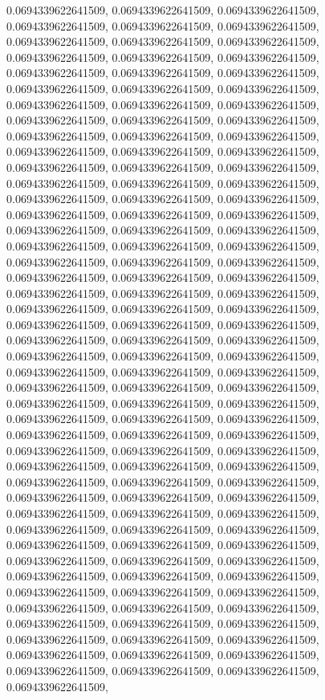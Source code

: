 \documentclass[
  ,man]{apa6}
\begin{document}
0.0694339622641509, 0.0694339622641509, 0.0694339622641509, 0.0694339622641509, 0.0694339622641509, 0.0694339622641509, 0.0694339622641509, 0.0694339622641509, 0.0694339622641509, 0.0694339622641509, 0.0694339622641509, 0.0694339622641509, 0.0694339622641509, 0.0694339622641509, 0.0694339622641509, 0.0694339622641509, 0.0694339622641509, 0.0694339622641509, 0.0694339622641509, 0.0694339622641509, 0.0694339622641509, 0.0694339622641509, 0.0694339622641509, 0.0694339622641509, 0.0694339622641509, 0.0694339622641509,
0.0694339622641509, 0.0694339622641509, 0.0694339622641509, 0.0694339622641509, 0.0694339622641509, 0.0694339622641509, 0.0694339622641509, 0.0694339622641509, 0.0694339622641509, 0.0694339622641509, 0.0694339622641509, 0.0694339622641509, 0.0694339622641509, 0.0694339622641509, 0.0694339622641509, 0.0694339622641509, 0.0694339622641509, 0.0694339622641509, 0.0694339622641509, 0.0694339622641509, 0.0694339622641509, 0.0694339622641509, 0.0694339622641509, 0.0694339622641509, 0.0694339622641509, 0.0694339622641509,
0.0694339622641509, 0.0694339622641509, 0.0694339622641509, 0.0694339622641509, 0.0694339622641509, 0.0694339622641509, 0.0694339622641509, 0.0694339622641509, 0.0694339622641509, 0.0694339622641509, 0.0694339622641509, 0.0694339622641509, 0.0694339622641509, 0.0694339622641509, 0.0694339622641509, 0.0694339622641509, 0.0694339622641509, 0.0694339622641509, 0.0694339622641509, 0.0694339622641509, 0.0694339622641509, 0.0694339622641509, 0.0694339622641509, 0.0694339622641509, 0.0694339622641509, 0.0694339622641509,
0.0694339622641509, 0.0694339622641509, 0.0694339622641509, 0.0694339622641509, 0.0694339622641509, 0.0694339622641509, 0.0694339622641509, 0.0694339622641509, 0.0694339622641509, 0.0694339622641509, 0.0694339622641509, 0.0694339622641509, 0.0694339622641509, 0.0694339622641509, 0.0694339622641509, 0.0694339622641509, 0.0694339622641509, 0.0694339622641509, 0.0694339622641509, 0.0694339622641509, 0.0694339622641509, 0.0694339622641509, 0.0694339622641509, 0.0694339622641509, 0.0694339622641509, 0.0694339622641509,
0.0694339622641509, 0.0694339622641509, 0.0694339622641509, 0.0694339622641509, 0.0694339622641509, 0.0694339622641509, 0.0694339622641509, 0.0694339622641509, 0.0694339622641509, 0.0694339622641509, 0.0694339622641509, 0.0694339622641509, 0.0694339622641509, 0.0694339622641509, 0.0694339622641509, 0.0694339622641509, 0.0694339622641509, 0.0694339622641509, 0.0694339622641509, 0.0694339622641509, 0.0694339622641509, 0.0694339622641509, 0.0694339622641509, 0.0694339622641509, 0.0694339622641509, 0.0694339622641509,
\end{document}
